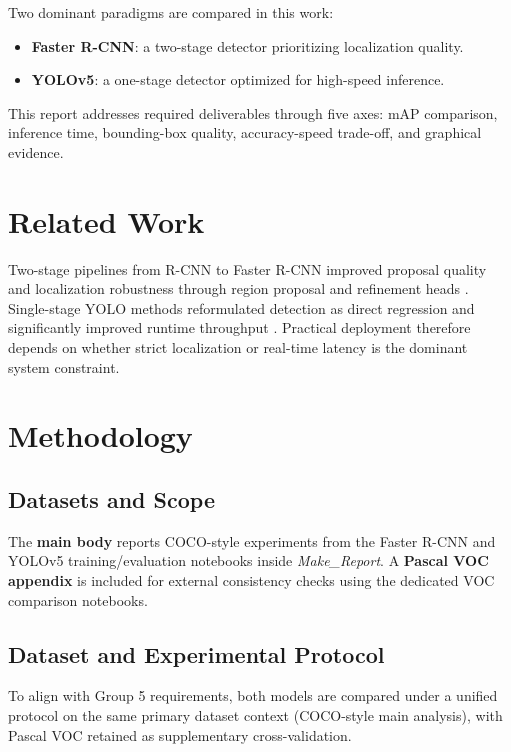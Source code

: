 \documentclass[conference]{IEEEtran}
\begin{document}
Two dominant paradigms are compared in this work:
\begin{itemize}
	\item \textbf{Faster R-CNN}: a two-stage detector prioritizing localization quality.
	\item \textbf{YOLOv5}: a one-stage detector optimized for high-speed inference.
\end{itemize}

This report addresses required deliverables through five axes: mAP comparison, inference time, bounding-box quality, accuracy-speed trade-off, and graphical evidence.

\section{Related Work}
Two-stage pipelines from R-CNN to Faster R-CNN improved proposal quality and localization robustness through region proposal and refinement heads \cite{ren2015faster}. Single-stage YOLO methods reformulated detection as direct regression and significantly improved runtime throughput \cite{redmon2016you,yolov5}. Practical deployment therefore depends on whether strict localization or real-time latency is the dominant system constraint.

\section{Methodology}
\subsection{Datasets and Scope}
The \textbf{main body} reports COCO-style experiments from the Faster R-CNN and YOLOv5 training/evaluation notebooks inside \textit{Make\_Report}. A \textbf{Pascal VOC appendix} is included for external consistency checks using the dedicated VOC comparison notebooks.

\subsection{Dataset and Experimental Protocol}
To align with Group 5 requirements, both models are compared under a unified protocol on the same primary dataset context (COCO-style main analysis), with Pascal VOC retained as supplementary cross-validation.
\end{document}
